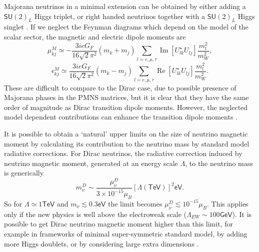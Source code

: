 Majorana neutrinos in a minimal extension can be obtained by either adding a $\textsf{SU}\left(2\right)_L$ Higgs triplet, or right handed neutrinos together with a $\textsf{SU}\left(2\right)_L$ Higgs singlet \cite{nuElmagInt2015.pdf}. If we neglect the Feynman diagrams which depend on the model of the scalar sector, the magnetic and electric dipole moments are
\begin{equation}
\mu_{kj}^M\simeq -\frac{3ieG_F}{16\sqrt{2}\pi^2}\left(m_k+m_j\right)\sum_{l=e,\mu ,\tau}\operatorname{Im}\left[U^{\star}_{lk}U_{lj}\right]\frac{m_l^2}{m_W^2},
\end{equation}
\begin{equation}
\epsilon_{kj}^M\simeq \frac{3ieG_F}{16\sqrt{2}\pi^2}\left(m_k-m_j\right)\sum_{l=e,\mu ,\tau}\operatorname{Re}\left[U^{\star}_{lk}U_{lj}\right]\frac{m_l^2}{m_W^2}.
\end{equation}
These are difficult to compare to the Dirac case, due to possible presence of Majorana phases in the PMNS matrices, but it is clear that they have the same order of magnitude as Dirac transition dipole moments. However, the neglected model dependent contributions can enhance the transition dipole moments \cite{nuElmagInt2015.pdf}.

It is possible \cite{nuMMMajoranaBounds2006.pdf} to obtain a `natural' upper limits on the size of neutrino magnetic moment by calculating its contribution to the neutrino mass by standard model radiative corrections. For Dirac neutrinos, the radiative correction induced by neutrino magnetic moment, generated at an energy scale $\Lambda$, to the neutrino mass is generically
\begin{equation}
m_{\nu}^D\sim\frac{\mu_{\nu}^D}{3\times 10^{-15}\mu_B}\left[\Lambda\left(\textsf{TeV}\right)\right]^2\textsf{eV}.
\end{equation}
So for $\Lambda\simeq 1\textsf{TeV}$  and $m_{\nu}\lesssim 0.3\textsf{eV}$ the limit becomes $\mu_{\nu}^D\lesssim 10^{-15}\mu_B$. This applies only if the new physics is well above the electroweak scale ($\Lambda_{EW} \sim 100\textsf{GeV}$). It is possible to get Dirac neutrino magnetic moment higher than this limit, for example in frameworks of minimal super-symmetric standard model, by adding more Higgs doublets, or by considering large extra dimensions \cite{nuElmagInt2015.pdf}.

